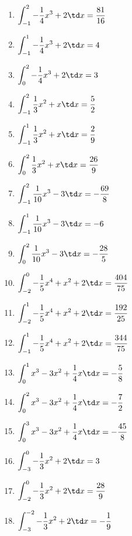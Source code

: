 \begin{Answer}[ref=integralRechnA1]\\
	\begin{enumerate}[label=\alph*)]
		\item \(\displaystyle\int_{-1}^{2} -\frac{1}{4}x^3+2\td x= \frac{81}{16}\)
		\item \(\displaystyle\int_{-1}^{1} -\frac{1}{4}x^3+2\td x= 4\)
		\item \(\displaystyle\int_{0}^{2} -\frac{1}{4}x^3+2\td x= 3\)
		
		\item \(\displaystyle\int_{-1}^{2} \frac{1}{3}x^2+x\td x= \frac{5}{2}\)
		\item \(\displaystyle\int_{-1}^{1} \frac{1}{3}x^2+x\td x= \frac{2}{9}\)
		\item \(\displaystyle\int_{0}^{2} \frac{1}{3}x^2+x\td x= \frac{26}{9}\)
		
		\item \(\displaystyle\int_{-1}^{2} \frac{1}{10}x^3-3\td x= -\frac{69}{8}\)
		\item \(\displaystyle\int_{-1}^{1} \frac{1}{10}x^3-3\td x= -6\)
		\item \(\displaystyle\int_{0}^{2} \frac{1}{10}x^3-3\td x= -\frac{28}{5}\)
		
		\item \(\displaystyle\int_{-2}^{0} -\frac{1}{5}x^4+x^2+2\td x= \frac{404}{75}\)
		\item \(\displaystyle\int_{-2}^{1} -\frac{1}{5}x^4+x^2+2\td x= \frac{192}{25}\)
		\item \(\displaystyle\int_{-1}^{1} -\frac{1}{5}x^4+x^2+2\td x= \frac{344}{75}\)
		
		\item \(\displaystyle\int_{0}^{1} x^3-3x^2+\frac{1}{4}x\td x= -\frac{5}{8}\)
		\item \(\displaystyle\int_{0}^{2} x^3-3x^2+\frac{1}{4}x\td x= -\frac{7}{2}\)
		\item \(\displaystyle\int_{0}^{3} x^3-3x^2+\frac{1}{4}x\td x= -\frac{45}{8}\)
		
		\item \(\displaystyle\int_{-3}^{0} -\frac{1}{3}x^2+2\td x= 3\)
		\item \(\displaystyle\int_{-2}^{0} -\frac{1}{3}x^2+2\td x= \frac{28}{9}\)
		\item \(\displaystyle\int_{-3}^{-2} -\frac{1}{3}x^2+2\td x= -\frac{1}{9}\)
	\end{enumerate}
\end{Answer}
